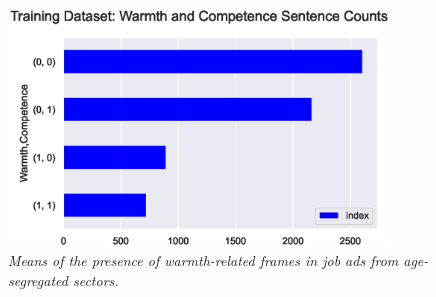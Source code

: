 \documentclass[Royal,sageapa,times]{sagej}
\begin{document}
\begin{landscape}
\begin{longtabu}
    \\
    \end{longtabu}
    \end{landscape}

\begin{figure}[ht]
\setlength{\fboxsep}{0pt}%
\setlength{\fboxrule}{0pt}%
\begin{center}
\includegraphics[width=0.90\textwidth]{FT/Figure5.eps}
\end{center}
\caption{\textit{Means of the presence of warmth-related frames in job ads from age-segregated sectors.}}
\label{figure5}
\end{figure}
\end{document}

